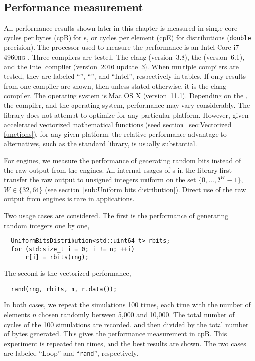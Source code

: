 \subsection{Performance measurement}
\label{sub:Performance measurement}

All performance results shown later in this chapter is measured in single core
cycles per bytes (cpB) for \rng{}s, or cycles per element (cpE) for
distributions (\verb|double| precision). The processor used to measure the
performance is an Intel Core i7-4960\textsc{hg} \cpu. Three compilers are
tested. The \llvm clang (version~3.8), the \gnu{} \gcc (version~6.1), and the
Intel \cpp compiler (version~2016 update~3). When multiple compilers are
tested, they are labeled ``\llvm'', ``\gnu'', and ``Intel'', respectively in
tables. If only results from one compiler are shown, then unless stated
otherwise, it is the \llvm clang compiler. The operating system is Mac OS X
(version~11.1). Depending on the \cpu, the compiler, and the operating system,
performance may vary considerably. The library does not attempt to optimize for
any particular platform. However, given accelerated vectorized mathematical
functions (seed section~\ref{sec:Vectorized functions}), for any given
platform, the relative performance advantage to alternatives, such as the
standard library, is usually substantial.

For \rng engines, we measure the performance of generating random bits instead
of the raw output from the engines. All internal usages of \rng{}s in the
library first transfer the raw output to unsigned integers uniform on the set
$\{0,\dots,2^W-1\}$, $W\in\{32,64\}$ (see section~\ref{sub:Uniform bits
  distribution}). Direct use of the raw output from \rng engines is rare in
applications.

Two usage cases are considered. The first is the performance of generating
random integers one by one,
\begin{Verbatim}
  UniformBitsDistribution<std::uint64_t> rbits;
  for (std:size_t i = 0; i != n; ++i)
      r[i] = rbits(rng);
\end{Verbatim}
The second is the vectorized performance,
\begin{Verbatim}
  rand(rng, rbits, n, r.data());
\end{Verbatim}
In both cases, we repeat the simulations 100 times, each time with the number
of elements $n$ chosen randomly between 5,000 and 10,000. The total number of
cycles of the 100 simulations are recorded, and then divided by the total
number of bytes generated. This gives the performance measurement in cpB. This
experiment is repeated ten times, and the best results are shown. The two cases
are labeled ``Loop'' and ``\verb|rand|'', respectively.

